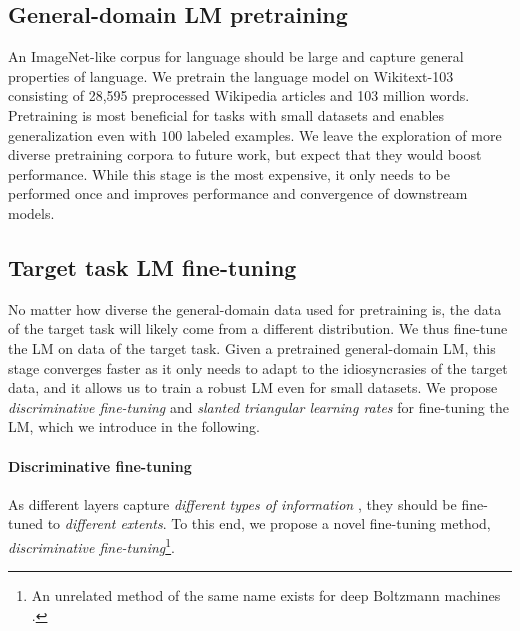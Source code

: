 \documentclass[11pt,a4paper]{article}
\begin{document}
\subsection{General-domain LM pretraining} \label{sec:pretraining}

An ImageNet-like corpus for language should be large and capture general properties of language. We pretrain the language model on Wikitext-103 \cite{Merity2016} consisting of 28,595 preprocessed Wikipedia articles and 103 million words. Pretraining is most beneficial for tasks with small datasets and enables generalization even with $100$ labeled examples. We leave the exploration of more diverse pretraining corpora to future work, but expect that they would boost performance. While this stage is the most expensive, it only needs to be performed once and improves performance and convergence of downstream models.

\subsection{Target task LM fine-tuning} \label{sec:lm-fine-tuning}

No matter how diverse the general-domain data used for pretraining is, the data of the target task will likely come from a different distribution. We thus fine-tune the LM on data of the target task. Given a pretrained general-domain LM, this stage converges faster as it only needs to adapt to the idiosyncrasies of the target data, and it allows us to train a robust LM even for small datasets. We propose \emph{discriminative fine-tuning } and \emph{slanted triangular learning rates} for fine-tuning the LM, which we introduce in the following.

\paragraph{Discriminative fine-tuning}

As different layers capture \emph{different types of information} \cite{yosinski2014transferable}, they should be fine-tuned to \emph{different extents}.
To this end, we propose a novel fine-tuning method, \emph{discriminative fine-tuning}\footnote{
An unrelated method of the same name exists for deep Boltzmann machines \cite{salakhutdinov2009deep}.}.
\end{document}
